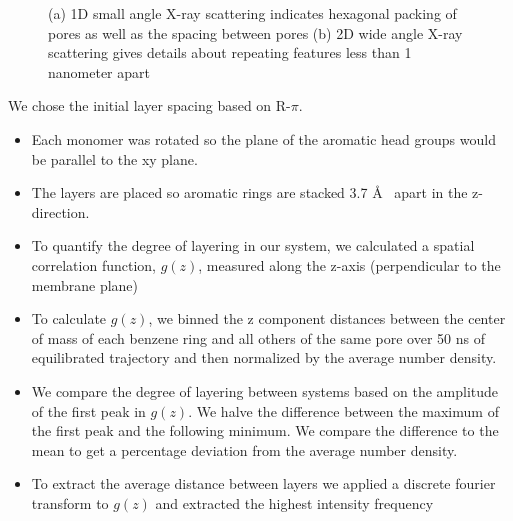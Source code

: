 \documentclass{article}
\newcommand{\angstrom}{\textup{\AA}}
\begin{document}
\begin{figure}[!ht]
\begin{subfigure}[t]{0.47\linewidth}
{                }
                \caption{}\label{fig:WAXS}
        \end{subfigure}
        \caption{(a) 1D small angle X-ray scattering indicates hexagonal packing of
	pores as well as the spacing between pores (b) 2D wide angle X-ray scattering 
	gives details about repeating features less than 1 nanometer apart}\label{fig:SWAXS}
  \end{figure}


  We chose the initial layer spacing based on R-$\pi$.
  \begin{itemize}  
    \item Each monomer was rotated so the plane of the aromatic head groups would
    be parallel to the xy plane.
    \item The layers are placed so aromatic rings are stacked 3.7 \angstrom~
    apart in the z-direction.
    \item To quantify the degree of layering in our system, we calculated
    a spatial correlation function, $g(z)$, measured along the z-axis 
    (perpendicular to the membrane plane)
    \item To calculate $g(z)$, we binned the z component distances between 
    the center of mass of each benzene ring and all others of the same pore 
    over 50 ns of equilibrated trajectory and then normalized by the average
    number density.
    \item We compare the degree of layering between systems based on the
    amplitude of the first peak in $g(z)$. We halve the difference between the
    maximum of the first peak and the following minimum. We compare the difference
    to the mean to get a percentage deviation from the average number density.
    \item To extract the average distance between layers we applied a discrete 
    fourier transform to $g(z)$ and extracted the highest intensity frequency 
  \end{itemize}
\end{document}
